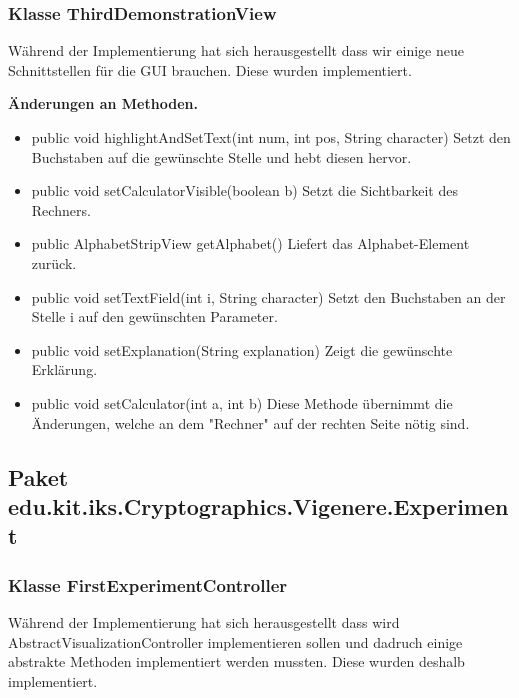 \documentclass{article}
\begin{document}
    \subsubsection{Klasse ThirdDemonstrationView}
	Während der Implementierung hat sich herausgestellt dass wir einige neue Schnittstellen für die GUI brauchen. Diese wurden implementiert.\newline
           
    \textbf{Änderungen an Methoden.}
      \begin{itemize}
		\item public void highlightAndSetText(int num, int pos, String character)\newline
              Setzt den Buchstaben auf die gewünschte Stelle und hebt diesen hervor.
		\item public void setCalculatorVisible(boolean b)\newline
              Setzt die Sichtbarkeit des Rechners.
		\item public AlphabetStripView getAlphabet()\newline
              Liefert das Alphabet-Element zurück.
		\item public void setTextField(int i, String character)\newline
              Setzt den Buchstaben an der Stelle i auf den gewünschten Parameter.
		\item public void setExplanation(String explanation)\newline
              Zeigt die gewünschte Erklärung.
		\item public void setCalculator(int a, int b)\newline
              Diese Methode übernimmt die Änderungen, welche an dem "Rechner" auf der rechten Seite nötig sind.
	  \end{itemize}
	  
  \subsection{Paket edu.kit.iks.Cryptographics.Vigenere.Experiment}
    \subsubsection{Klasse FirstExperimentController}
	Während der Implementierung hat sich herausgestellt dass wird AbstractVisualizationController implementieren sollen und dadruch 
	einige abstrakte Methoden implementiert werden mussten. Diese wurden deshalb implementiert.\newline
           
\end{document}

